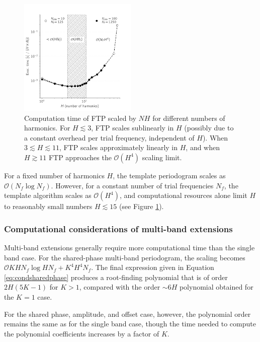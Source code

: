 \documentclass[apj]{emulateapj}
\newcommand{\bigO}{\mathcal{O}}
\begin{document}
\begin{figure}
    \centering
    \includegraphics[width=0.5\textwidth]{plots/timing_vs_nharm.pdf}
    \caption{\label{fig:timingnharm} Computation time of FTP scaled by $NH$ for
            different numbers of harmonics. For $H\lesssim 3$, FTP scales
            sublinearly in $H$ (possibly due to a constant overhead per
            trial frequency, independent of $H$). When $3 \lesssim H \lesssim 11$,
            FTP scales approximately linearly in $H$, and when $H \gtrsim 11$
            FTP approaches the $\bigO(H^4)$ scaling limit.}
\end{figure}

For a fixed number of harmonics $H$, the template periodogram scales as
$\bigO(N_f\log N_f)$. However, for a constant number of trial frequencies $N_f$, 
the template algorithm scales as $\bigO(H^4)$, and computational resources
alone limit $H$ to reasonably small numbers $H\lesssim15$ (see Figure \ref{fig:timingnharm}).


\subsubsection{Computational considerations of multi-band extensions}
Multi-band extensions generally require more computational
time than the single band case. For the shared-phase multi-band periodogram,
the scaling becomes $\bigO{KHN_f\log HN_f + K^4H^4N_f}$. The final expression given
in Equation \ref{eq:condsharedphase} produces a root-finding polynomial that is of order
$2H(5K - 1)$ for $K > 1$, compared with the order $\sim 6H$ polynomial obtained for
the $K=1$ case.

For the shared phase, amplitude, and offset case, however, the polynomial
order remains the same as for the single band case, though the time needed to compute
the polynomial coefficients increases by a factor of $K$. 
\end{document}
